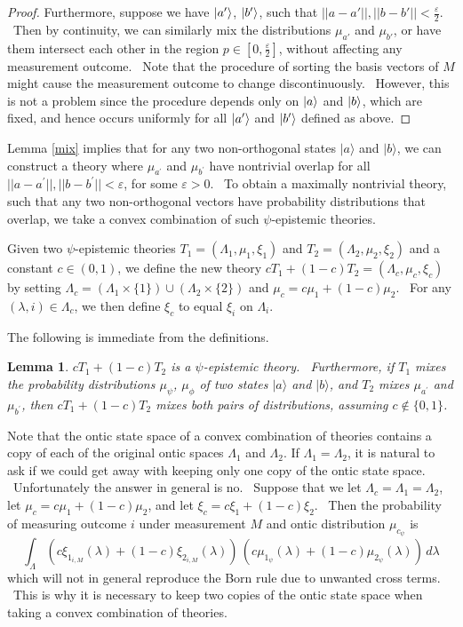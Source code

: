 \documentclass[letterpaper,12pt]{article}
\newtheorem{lem}{Lemma}
\newcommand{\ket}[1]{\mbox{$ | #1 \rangle $}}
\begin{document}
\begin{proof}
Furthermore, suppose we have $\ket{a'}$, $\ket{b'}$, such that $||a-a'||, ||b-b'||<\frac{\varepsilon}{2}$. \ Then by continuity, we can similarly mix the distributions $\mu_{a'}$ and $\mu_{b'}$, or have them intersect each other in the region $p\in[0,\frac{\varepsilon}{2}]$, without affecting any measurement outcome. \ Note that the procedure of sorting the basis vectors of $M$ might cause the measurement outcome to change discontinuously. \ However, this is not a problem since the procedure depends only on $\ket{a}$ and $\ket{b}$, which are fixed, and hence occurs uniformly for all $\ket{a'}$ and $\ket{b'}$ defined as above.
\end{proof}

Lemma \ref{mix} implies that for any two non-orthogonal states $ |
a \rangle $ and $ | b \rangle $, we can construct a theory
where $\mu_{a^{\prime }}$ and $\mu_{b^{\prime }}$ have nontrivial
overlap for all $||a-a^{\prime }||, ||b-b^{\prime }||<\varepsilon$,
for some $\varepsilon>0$. \ To obtain a maximally nontrivial theory, such that
any two non-orthogonal vectors have probability distributions that overlap,
we take a convex combination of such $\psi$-epistemic theories.

Given two $\psi$-epistemic theories $T_1=(\Lambda_1,\mu_1,\xi_1)$ and $%
T_2=(\Lambda_2,\mu_2,\xi_2)$ and a constant $c\in(0,1)$, we define the new
theory $cT_1+(1-c)T_2=(\Lambda_c,\mu_c,\xi_c)$ by setting $%
\Lambda_c=\left(\Lambda_1 \times \{1\} \right) \cup \left(\Lambda_2 \times
\{2\} \right)$ and $\mu_c = c\mu_1 + (1-c)\mu_2$. \ For any $%
(\lambda,i)\in\Lambda_c$, we then define $\xi_c$ to equal $\xi_i$ on $%
\Lambda_i$.

The following is immediate from the definitions.

\begin{lem}
\label{convex} $cT_1+(1-c)T_2$ is a $\psi$-epistemic theory. \ Furthermore,
if $T_1$ mixes the probability distributions $\mu_{\psi}$, $\mu_{\phi}$ of
two states $ | a \rangle $ and $ | b \rangle $, and $%
T_2$ mixes $\mu_{a^{\prime }}$ and $\mu_{b^{\prime }}$, then $%
cT_1+(1-c)T_2$ mixes both pairs of distributions, assuming $c\not\in\{0,1\}$.
\end{lem}


Note that the ontic state space of a convex combination of theories contains a copy of each of the original ontic spaces $\Lambda_1$ and $\Lambda_2$. If $\Lambda_1 =\Lambda_2$, it is natural to ask if we could get away with keeping only one copy of the ontic state space. \ Unfortunately the answer in general is no. \ Suppose that we let $\Lambda_c= \Lambda_1 =\Lambda_2$, let $\mu_c = c\mu_1 + (1-c)\mu_2$, and let $\xi_c = c\xi_1 + (1-c)\xi_2$. \ Then the probability of measuring outcome $i$ under measurement $M$ and ontic distribution $\mu_{c_\psi}$ is
\[\int_\Lambda \left(c\xi_{1_{i,M}}(\lambda)+(1-c)\xi_{2_{i,M}}(\lambda)\right)\,\left(c\mu_{1_\psi}(\lambda)+(1-c)\mu_{2_\psi}(\lambda)\right)\,d\lambda   \]
which will not in general reproduce the Born rule due to unwanted cross terms. \ This is why it is necessary to keep two copies of the ontic state space when taking a convex combination of theories.
\end{document}
